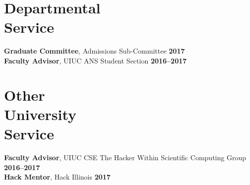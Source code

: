\documentclass[margin,line]{resume}
\begin{document}
\begin{resume}
    \section{\mysidestyle Departmental\\Service}
		\textbf{Graduate Committee}, Admissions Sub-Committee \hfill \textbf{2017}\vspace{.5mm}\\%
		\textbf{Faculty Advisor}, UIUC ANS Student Section \hfill \textbf{2016--2017}\vspace{.5mm}\\%
    \section{\mysidestyle Other\\University\\Service}
		\textbf{Faculty Advisor}, UIUC CSE The Hacker Within Scientific Computing Group \hfill \textbf{2016--2017}\vspace{.5mm}\\%
		\textbf{Hack Mentor}, Hack Illinois \hfill \textbf{2017}\vspace{.5mm}\\%




\end{resume}
\end{document}
